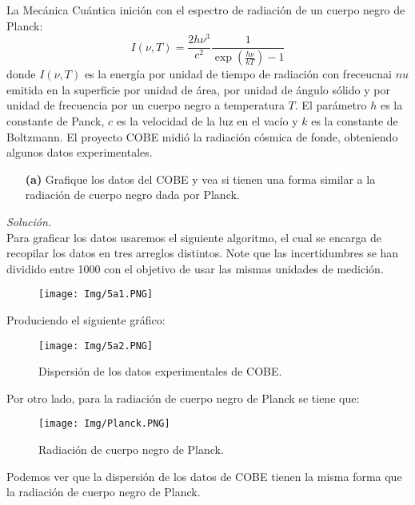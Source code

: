\documentclass[11pt]{article}
\begin{document}
	La Mecánica Cuántica inición con el espectro de radiación de un cuerpo negro de Planck:
	\begin{equation}
		I(\nu, T) = \frac{2h \nu^3}{c^2}\frac{1}{\exp(\frac{h\nu}{kT}) -1}	\label{Planck}
	\end{equation}
	donde $I(\nu,T)$ es la energía por unidad de tiempo de radiación con freceucnai $nu$ emitida en la superficie por unidad de área, por unidad de ángulo sólido y por unidad de frecuencia por un cuerpo negro a temperatura $T$. El parámetro $h$ es la constante de Panck, $c$ es la velocidad de la luz en el vacío y $k$ es la constante de Boltzmann. El proyecto COBE midió la radiación cósmica de fonde, obteniendo algunos datos experimentales.
	
\begin{enumerate}
	\item [\textbf{(a)}] Grafique los datos del COBE y vea si tienen una forma similar a la radiación de cuerpo negro dada por Planck.
\end{enumerate}
\textit{Solución.}\\
	Para graficar los datos usaremos el siguiente algoritmo, el cual se encarga de recopilar los datos en tres arreglos distintos. Note que las incertidumbres se han dividido entre 1000 con el objetivo de usar las mismas unidades de medición.
	\begin{figure}[h]
		\centering
		\texttt{[image: Img/5a1.PNG]}
	\end{figure}
	
	Produciendo el siguiente gráfico:
\newpage
	\begin{figure}[h]
		\centering
		\texttt{[image: Img/5a2.PNG]}
		\caption{Dispersión de los datos experimentales de COBE.}
	\end{figure}
	
	Por otro lado, para la radiación de cuerpo negro de Planck se tiene que:
	
	\begin{figure}[h]
		\centering
		\texttt{[image: Img/Planck.PNG]}
		\caption{Radiación de cuerpo negro de Planck.}
	\end{figure}
	
	Podemos ver que la dispersión de los datos de COBE tienen la misma forma que la radiación de cuerpo negro de Planck.
	
\end{document}
